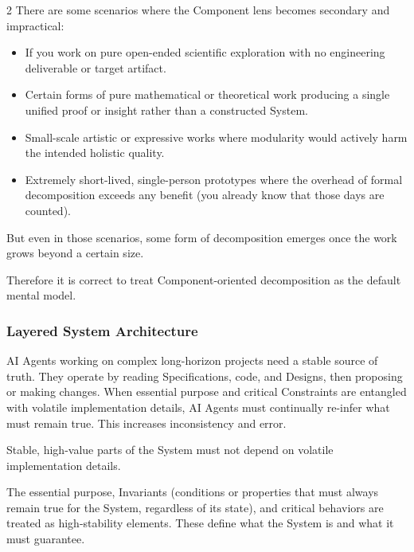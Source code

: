 \begin{multicols}{2}
There are some scenarios where the Component lens becomes secondary and impractical:

\begin{itemize}\setlength{\itemsep}{0pt}\setlength{\parskip}{0pt}

\item If you work on pure open-ended scientific exploration with no engineering deliverable or target artifact.

\item Certain forms of pure mathematical or theoretical work producing a single unified proof or insight rather than a constructed System.

\item Small-scale artistic or expressive works where modularity would actively harm the intended holistic quality.

\item Extremely short-lived, single-person prototypes where the overhead of formal decomposition exceeds any benefit (you already know that those days are counted).

\end{itemize}

But even in those scenarios, some form of decomposition emerges once the work grows beyond a certain size.

Therefore it is correct to treat Component-oriented decomposition as the default mental model.

\hypertarget{gp-LSA}{}

\subsubsection*{Layered System Architecture}

AI Agents working on complex long-horizon projects need a stable source of truth. They operate by reading Specifications, code, and Designs, then proposing or making changes. When essential purpose and critical Constraints are entangled with volatile implementation details, AI Agents must continually re-infer what must remain true. This increases inconsistency and error.

Stable, high-value parts of the System must not depend on volatile implementation details.

The essential purpose, Invariants (conditions or properties that must always remain true for the System, regardless of its state), and critical behaviors are treated as high-stability elements. These define what the System is and what it must guarantee.


\end{multicols}
